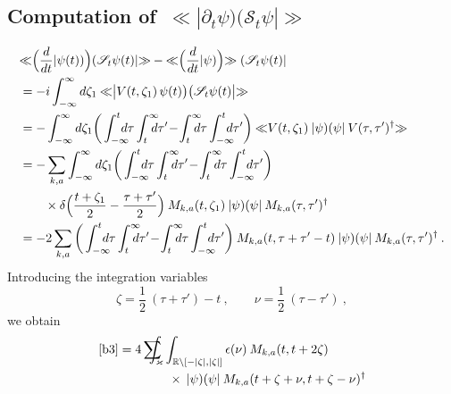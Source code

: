 \documentclass[reqno,11pt]{amsart}
\numberwithin{equation}{section}
\newcommand{\bbra}{\mathopen{\ll}}
\newcommand{\kket}{\mathclose{\gg}}
\newcommand{\R}{\mathbb{R}}
\newcommand{\1}{\mathds{1}}
\newcommand{\Sig}{\mathscr{S}}
\newcommand{\sint}{\sum  \!\!\!\!\!\!\! \int }
\begin{document}
{\subsection{Computation of~$\bbra |\partial_t \psi)(\Sig_t \psi| \kket$}
\begin{align}
&\bbra \Big( \frac{d}{dt} | \psi(t)) \Big)  ( \Sig_t \psi(t) | \kket - \bbra \Big( \frac{d}{dt} |\psi) \Big) \kket \;
( \Sig_t \psi(t)| \notag \\
&= -i \int_{-\infty}^\infty d\zeta_1 \: \bbra \big| V(t, \zeta_1)\, \psi(t) \big) \big( \Sig_t \psi(t) \big| \kket \notag \\
&= -\int_{-\infty}^\infty d\zeta_1 \bigg( \int_{-\infty}^t \!\!\!\!\!d\tau \int_t^\infty \!\!\!\!\!d\tau' \!-\! \int_t^\infty \!\!\!\!\!d\tau \int_{-\infty}^t \!\!\!\!\!d\tau' \bigg) \: \bbra V(t, \zeta_1)\: | \psi)(\psi|\:V(\tau,\tau')^\dagger \kket \notag \\
&= - \sum_{k,a} \int_{-\infty}^\infty d\zeta_1 \bigg( \int_{-\infty}^t \!\!\!\!\!d\tau \int_t^\infty \!\!\!\!\!d\tau' \!-\! \int_t^\infty \!\!\!\!\!d\tau \int_{-\infty}^t \!\!\!\!\!d\tau' \bigg) \notag \\
&\qquad \times \delta \Big( \frac{t+\zeta_1}{2} - \frac{\tau+\tau'}{2} \Big)\:
M_{k,a}(t, \zeta_1)\: | \psi)(\psi|\:M_{k,a}(\tau,\tau')^\dagger \notag \\
&= -2\sum_{k,a} \bigg( \int_{-\infty}^t \!\!\!\!\!d\tau \int_t^\infty \!\!\!\!\!d\tau' \!-\! \int_t^\infty \!\!\!\!\!d\tau \int_{-\infty}^t \!\!\!\!\!d\tau' \bigg) \: M_{k,a}(t, \tau+\tau'-t)\: | \psi)(\psi|\:M_{k,a}(\tau,\tau')^\dagger \:. \label{b3}
\end{align}
Introducing the integration variables
\[ \zeta = \frac{1}{2}\:(\tau+\tau')-t \:,\qquad \nu = \frac{1}{2}\: (\tau-\tau')\:, \]
we obtain
\begin{align*}
\eqref{b3} &= 4 \sint_\varkappa \int_{\R \setminus [-|\zeta|, |\zeta|]} \epsilon(\nu)\:
M_{k,a} (t, t+2 \zeta) \\
&\qquad\qquad \times\:|\psi)(\psi|\: M_{k,a} (t+\zeta+\nu, t+\zeta-\nu)^\dagger
\end{align*}

}
\end{document}
